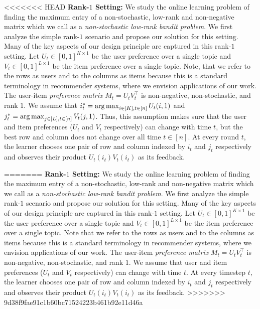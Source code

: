 <<<<<<< HEAD
\textbf{Rank-$1$ Setting:} We study the online learning problem of finding the maximum entry of a non-stochastic, low-rank and non-negative matrix which we call as a \emph{non-stochastic low-rank bandit problem}. We first analyze the simple rank-$1$ scenario and propose our solution for this setting. Many of the key aspects of our design principle are captured in this rank-$1$ setting. Let $U_t\in [0,1]^{K\times 1}$ be the user preference over a single topic and $V_t \in [0,1]^{L\times 1}$ be the item preference over a single topic. Note, that we refer to the rows as users and to the columns as items because this is a standard terminology in recommender systems, where we envision applications of our work. The user-item \emph{preference matrix} $M_t = U_tV_t^{\intercal}$ is non-negative, non-stochastic, and rank $1$. We assume that $i^\ast_t = \mathop{\rm arg\,max}_{i\in[K], t\in[n]}U_t(i,1)$ and  $j^\ast_t = \mathop{\rm arg\,max}_{j\in[L], t\in[n]}V_t(j,1)$. Thus, this assumption makes sure that the user and item preferences ($U_t$ and $V_t$ respectively) can change with time $t$, but the best row and column does not change over all time $t\in[n]$. At every round $t$, the learner chooses one pair of row and column indexed by $i_t$ and $j_t$ respectively and observes their product $U_t(i_t)V_t(i_t)$ as its feedback.

=======
\textbf{Rank-$1$ Setting:} We study the online learning problem of finding the maximum entry of a non-stochastic, low-rank and non-negative matrix  which we call as a \emph{non-stochastic low-rank bandit problem}. We first analyze the simple rank-$1$ scenario and propose our solution for this setting. Many of the key aspects of our design principle are captured in this rank-$1$ setting. Let $U_t\in [0,1]^{K\times 1}$ be the user preference over a single topic and $V_t \in [0,1]^{L\times 1}$ be the item preference over a single topic. Note that we refer to the rows as users and to the columns as items because this is a standard terminology in recommender systems, where we envision applications of our work. The user-item \emph{preference matrix} $M_t = U_tV_t^{\intercal}$ is non-negative, non-stochastic, and rank $1$. We assume that user and item preferences ($U_t$ and $V_t$ respectively) can change with time $t$.  At every timestep  $t$, the learner chooses one pair of row and column indexed by $i_t$ and $j_t$ respectively and observes their product $U_t(i_t)V_t(i_t)$ as its feedback.
>>>>>>> 9d38f9fae91c1b60bc71524223b461b92e11d46a

